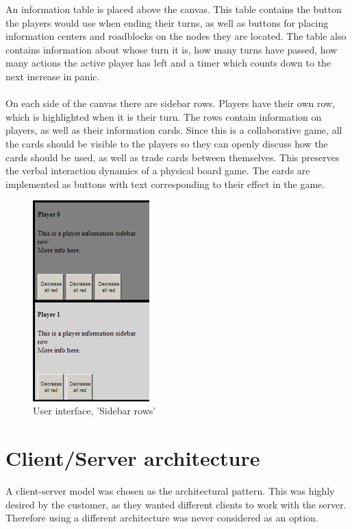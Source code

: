 An information table is placed above the canvas. This table contains the button the players would use when ending their turns, as well as buttons for placing information centers and roadblocks on the nodes they are located. The table also contains information about whose turn it is, how many turns have passed, how many actions the active player has left and a timer which counts down to the next increase in panic. \\
\\
On each side of the canvas there are sidebar rows. Players have their own row, which is highlighted when it is their turn. The rows contain information on players, as well as their information cards. Since this is a collaborative game, all the cards should be visible to the players so they can openly discuss how the cards should be used, as well as trade cards between themselves. This preserves the verbal interaction dynamics of a physical board game. The cards are implemented as buttons with text corresponding to their effect in the game. \\

\begin{figure}[H]
  \centering
    \includegraphics[width=0.4\textwidth]{img/sidebarrowssmall.png}
  \caption{User interface, 'Sidebar rows'} 
  \label{fig:sidebar}
\end{figure}




\section{Client/Server architecture}
A client-server model was chosen as the architectural pattern. This was highly desired by the customer, as they wanted different clients
to work with the server. Therefore using a different architecture was never considered as an option.

